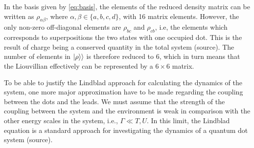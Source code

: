 \documentclass[../main.tex]{subfiles}
\begin{document}
In the basis given by \cref{eq:basis}, the elements of the reduced density matrix can be written as $\rho_{\alpha\beta}$, where $\alpha,\beta\in\{a,b,c,d\}$, with 16 matrix elements. However, the only non-zero off-diagonal elements are $\rho_{bc}$ and $\rho_{cb}$, i.e, the elements which corresponds to superpositions the two states with one occupied dot. This is the result of charge being a conserved quantity in the total system (source). The number of elements in $\ket{\rho}\rangle$ is therefore reduced to 6, which in turn means that the Liouvillian effectively can be represented by a $6\times6$ matrix.

To be able to justify the Lindblad approach for calculating the dynamics of the system, one more major approximation have to be made regarding the coupling between the dots and the leads. We must assume that the strength of the coupling between the system and the environment is weak in comparison with the other energy scales in the system, i.e., $\Gamma \ll T, U$. In this limit, the Lindblad equation is a standard approach for investigating the dynamics of a quantum dot system (source).

\end{document}
